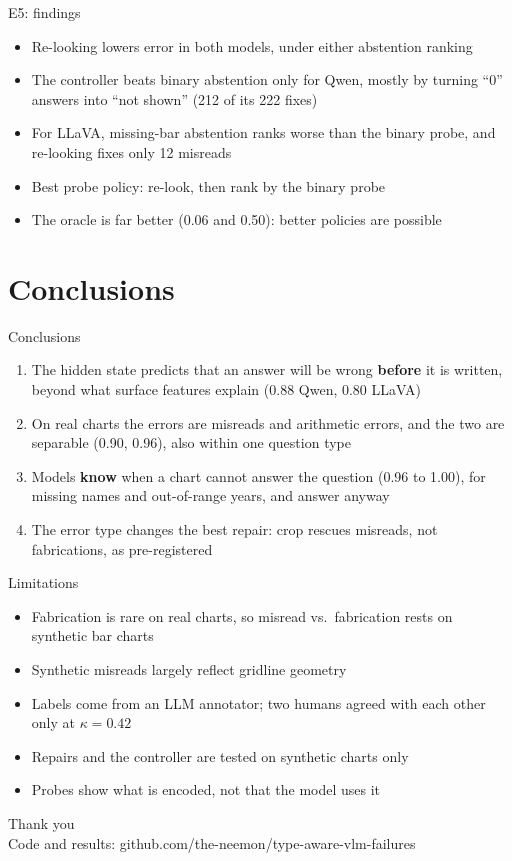 \documentclass[10pt,aspectratio=169]{beamer}
\begin{document}
\begin{frame}{E5: findings}
\begin{itemize}
\item Re-looking lowers error in both models, under either abstention ranking
\item The controller beats binary abstention only for Qwen, mostly by turning
``0'' answers into ``not shown'' (212 of its 222 fixes)
\item For LLaVA, missing-bar abstention ranks worse than the binary probe, and
re-looking fixes only 12 misreads
\item Best probe policy: re-look, then rank by the binary probe
\item The oracle is far better (0.06 and 0.50): better policies are possible
\end{itemize}
\end{frame}

\section{Conclusions}

\begin{frame}{Conclusions}
\begin{enumerate}
\item The hidden state predicts that an answer will be wrong \textbf{before} it is
written, beyond what surface features explain (0.88 Qwen, 0.80 LLaVA)
\item On real charts the errors are misreads and arithmetic errors, and the two
are separable (0.90, 0.96), also within one question type
\item Models \textbf{know} when a chart cannot answer the question (0.96 to 1.00),
for missing names and out-of-range years, and answer anyway
\item The error type changes the best repair: crop rescues misreads, not
fabrications, as pre-registered
\end{enumerate}
\end{frame}

\begin{frame}{Limitations}
\begin{itemize}
\item Fabrication is rare on real charts, so misread vs.\ fabrication rests on
synthetic bar charts
\item Synthetic misreads largely reflect gridline geometry
\item Labels come from an LLM annotator; two humans agreed with each other only
at $\kappa=0.42$
\item Repairs and the controller are tested on synthetic charts only
\item Probes show what is encoded, not that the model uses it
\end{itemize}
\end{frame}

\begin{frame}[standout]
Thank you\\[0.6em]
{\normalsize Code and results: github.com/the-neemon/type-aware-vlm-failures}
\end{frame}
\end{document}
